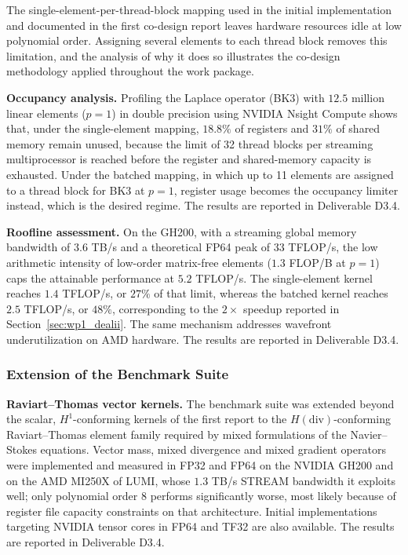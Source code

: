 \documentclass[a4paper,12pt, numbers]{article}
\begin{document}
\noindent The single-element-per-thread-block mapping used in the initial implementation and documented in the first co-design report leaves hardware resources idle at low polynomial order. Assigning several elements to each thread block removes this limitation, and the analysis of why it does so illustrates the co-design methodology applied throughout the work package.

\noindent\textbf{Occupancy analysis.}
Profiling the Laplace operator (BK3) with $12.5$ million linear elements ($p=1$) in double precision using NVIDIA Nsight Compute shows that, under the single-element mapping, $18.8\%$ of registers and $31\%$ of shared memory remain unused, because the limit of 32 thread blocks per streaming multiprocessor is reached before the register and shared-memory capacity is exhausted. Under the batched mapping, in which up to 11 elements are assigned to a thread block for BK3 at $p=1$, register usage becomes the occupancy limiter instead, which is the desired regime. The results are reported in Deliverable D3.4.

\noindent\textbf{Roofline assessment.}
On the GH200, with a streaming global memory bandwidth of $3.6$ TB/s and a theoretical FP64 peak of $33$ TFLOP/s, the low arithmetic intensity of low-order matrix-free elements ($1.3$ FLOP/B at $p=1$) caps the attainable performance at $5.2$ TFLOP/s. The single-element kernel reaches $1.4$ TFLOP/s, or $27\%$ of that limit, whereas the batched kernel reaches $2.5$ TFLOP/s, or $48\%$, corresponding to the $2\times$ speedup reported in Section~\ref{sec:wp1_dealii}. The same mechanism addresses wavefront underutilization on AMD hardware. The results are reported in Deliverable D3.4.

\subsubsection*{Extension of the Benchmark Suite}

\noindent\textbf{Raviart--Thomas vector kernels.}
The benchmark suite was extended beyond the scalar, $H^1$-conforming kernels of the first report to the $H(\mathrm{div})$-conforming Raviart--Thomas element family required by mixed formulations of the Navier--Stokes equations. Vector mass, mixed divergence and mixed gradient operators were implemented and measured in FP32 and FP64 on the NVIDIA GH200 and on the AMD MI250X of LUMI, whose $1.3$ TB/s STREAM bandwidth it exploits well; only polynomial order 8 performs significantly worse, most likely because of register file capacity constraints on that architecture. Initial implementations targeting NVIDIA tensor cores in FP64 and TF32 are also available. The results are reported in Deliverable D3.4.
\end{document}
